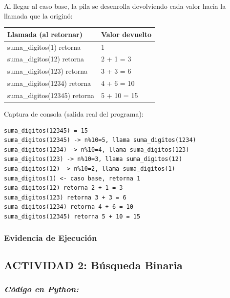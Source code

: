 \documentclass[12pt,a4paper]{article}
\begin{document}
\vspace{6pt}
Al llegar al caso base, la pila se desenrolla devolviendo cada valor hacia la llamada
que la originó:

\begin{center}
\begin{tabular}{|l|l|}
\hline
\textbf{Llamada (al retornar)} & \textbf{Valor devuelto} \\
\hline
suma\_digitos(1) retorna & 1 \\
\hline
suma\_digitos(12) retorna & 2 + 1 = 3 \\
\hline
suma\_digitos(123) retorna & 3 + 3 = 6 \\
\hline
suma\_digitos(1234) retorna & 4 + 6 = 10 \\
\hline
suma\_digitos(12345) retorna & 5 + 10 = 15 \\
\hline
\end{tabular}
\end{center}

\vspace{6pt}
Captura de consola (salida real del programa):

\begin{lstlisting}[style=consola]
suma_digitos(12345) = 15
suma_digitos(12345) -> n%10=5, llama suma_digitos(1234)
suma_digitos(1234) -> n%10=4, llama suma_digitos(123)
suma_digitos(123) -> n%10=3, llama suma_digitos(12)
suma_digitos(12) -> n%10=2, llama suma_digitos(1)
suma_digitos(1) <- caso base, retorna 1
suma_digitos(12) retorna 2 + 1 = 3
suma_digitos(123) retorna 3 + 3 = 6
suma_digitos(1234) retorna 4 + 6 = 10
suma_digitos(12345) retorna 5 + 10 = 15
\end{lstlisting}

\subsubsection*{Evidencia de Ejecución}


\newpage
\subsection*{ACTIVIDAD 2: Búsqueda Binaria}

\subsubsection*{\textit{Código en Python:}}
\end{document}
